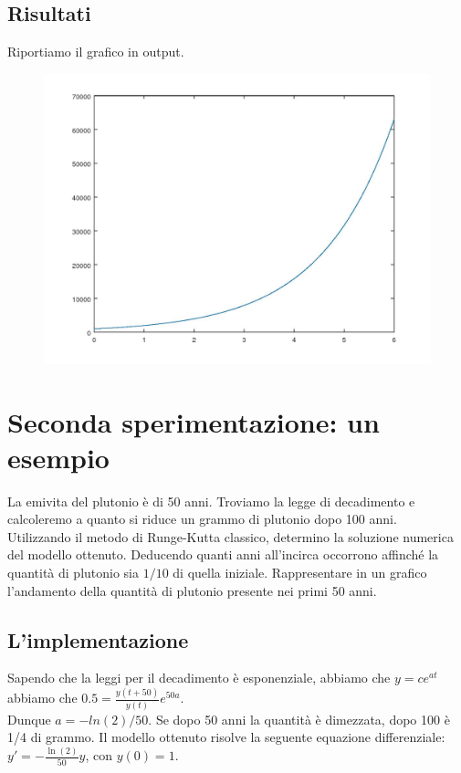\documentclass{article}
\begin{document}
	\subsection{Risultati}
	Riportiamo il grafico in output.
	\begin{figure}[htp!]
		\centering 
		\includegraphics[width=\textwidth]{3_1.jpeg}
	\end{figure}
			\section{Seconda sperimentazione: un esempio}
	La emivita del plutonio è di 50 anni. Troviamo la legge di decadimento e calcoleremo a quanto si riduce un grammo di plutonio dopo 100 anni.\\
	Utilizzando il metodo di Runge-Kutta classico, determino la soluzione numerica del modello ottenuto. Deducendo quanti anni all’incirca occorrono affinché la quantità di plutonio sia $1/10$ di quella iniziale. Rappresentare in un grafico l’andamento della quantità di plutonio presente nei primi 50 anni.
	
	\subsection{L'implementazione}
	Sapendo che la leggi per il decadimento è esponenziale, abbiamo che $y=c e^{at}$ abbiamo che $0.5=\frac{y(t+50)}{y(t)} e^{50a}$.\\
	Dunque $a=-ln(2)/50$. Se dopo 50 anni la quantità è dimezzata, dopo 100 è 1/4 di grammo. Il modello ottenuto risolve la seguente equazione differenziale: $y'=-\frac{\ln(2)}{50} y$, con $y(0)=1$.
\end{document}
